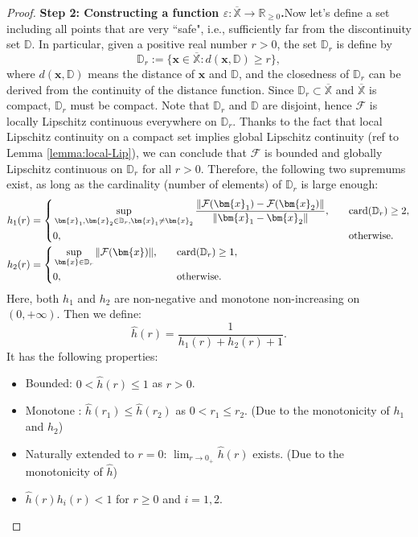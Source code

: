 \documentclass{amsart} %
\def\vx{{\bm{x}}}
\def\sD{{\mathbb{D}}}
\def\sR{{\mathbb{R}}}
\def\sX{{\mathbb{X}}}
\def\cF{{\mathcal{F}}}
\theoremstyle{definition}
\theoremstyle{remark}
\begin{document}
\begin{proof}
\textbf{Step 2: Constructing a function $\varepsilon: \overline{\sX} \to \sR_{\ge 0}$.}Now let's define a set including all points that are very ``safe", i.e., sufficiently far from the discontinuity set $\sD$. In particular, given a positive real number $r>0$, the set $\sD_r$ is define by 
\[\sD_r:= \big\{ \vx \in \overline{\sX}: d(\vx, \sD) \geq r \big\},\]
where $d(\vx, \sD)$ means the distance of $\vx$ and $\sD$, and the closedness of $\sD_r$ can be derived from the continuity of the distance function. Since $\sD_r \subset \overline{\sX}$ and $\overline{\sX}$ is compact, $\sD_r$ must be compact. Note that $\sD_r$ and $\sD$ are disjoint, hence $\cF$ is locally Lipschitz continuous everywhere on $\sD_r$. Thanks to the fact that local Lipschitz continuity on a compact set implies global Lipschitz continuity (ref to Lemma \ref{lemma:local-Lip}), we can conclude that $\cF$ is bounded and globally Lipschitz continuous on $\sD_r$ for all $r > 0$. Therefore, the following two supremums exist, as long as the cardinality (number of elements) of $\sD_r$ is large enough:
\begin{align*}
         & h_1(r)=\left\{
\begin{aligned}
    & \sup_{\vx_1,\vx_2\in\sD_r,\vx_1\not=\vx_2}\frac{ \|\cF(\vx_1)-\cF(\vx_2) \| }{\|\vx_1-\vx_2\|},  \quad &&  \mathrm{card}(\sD_r) \geq 2, \\
& 0,  && \textup{otherwise}.
\end{aligned}\right.
\\ 
& h_2(r)= \left\{
\begin{aligned}
& \sup_{\vx\in\sD_r}\|\cF(\vx)\|, \quad && \mathrm{card}(\sD_r) \geq 1,\\
& 0, && \textup{otherwise}.
\end{aligned}\right.  
\end{align*}
    Here, both $h_1$ and $h_2$ are non-negative and monotone non-increasing on $(0,+\infty)$. Then we define:
    \[ \hat{h}(r) = \frac{1}{h_1(r) + h_2(r) + 1}. \]
    It has the following properties:
    \begin{itemize}[leftmargin=5mm]
        \item Bounded: $ 0 < \hat{h}(r) \leq 1$ as $r > 0$.
        \item Monotone : $\hat{h}(r_1) \leq \hat{h}(r_2)$ as $0 < r_1 \leq r_2$. (Due to the monotonicity of $h_1$ and $h_2$)
        \item Naturally extended to $r=0$: $\lim_{r\to 0_{+}}\hat{h}(r)$ exists. (Due to the monotonicity of $\hat{h}$)
        \item $\hat{h}(r) h_i(r) < 1$ for $r \geq 0$ and $i=1,2$.

\end{itemize}
\end{proof}
\end{document}
